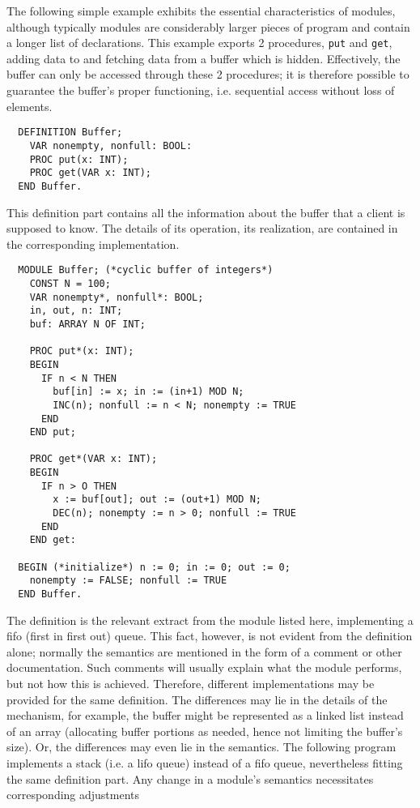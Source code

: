The following simple example exhibits the essential characteristics of modules, although
typically modules are considerably larger pieces of program and contain a longer list of
declarations. This example exports 2 procedures, \verb|put| and \verb|get|, adding data to
and fetching data from a buffer which is hidden. Effectively, the buffer can only be
accessed through these 2 procedures; it is therefore possible to guarantee the buffer's
proper functioning, i.e. sequential access without loss of elements.
\begin{verbatim}
  DEFINITION Buffer;
    VAR nonempty, nonfull: BOOL:
    PROC put(x: INT);
    PROC get(VAR x: INT);
  END Buffer.
\end{verbatim}
This definition part contains all the information about the buffer that a client is supposed
to know. The details of its operation, its realization, are contained in the corresponding
implementation.
\begin{verbatim}
  MODULE Buffer; (*cyclic buffer of integers*)
    CONST N = 100;
    VAR nonempty*, nonfull*: BOOL;
    in, out, n: INT;
    buf: ARRAY N OF INT;
 
    PROC put*(x: INT);
    BEGIN
      IF n < N THEN
        buf[in] := x; in := (in+1) MOD N;
        INC(n); nonfull := n < N; nonempty := TRUE
      END
    END put;
 
    PROC get*(VAR x: INT);
    BEGIN
      IF n > O THEN
        x := buf[out]; out := (out+1) MOD N;
        DEC(n); nonempty := n > 0; nonfull := TRUE
      END
    END get:
 
  BEGIN (*initialize*) n := 0; in := 0; out := 0;
    nonempty := FALSE; nonfull := TRUE
  END Buffer.
\end{verbatim}
The definition is the relevant extract from the module listed here, implementing a fifo
(first in first out) queue. This fact, however, is not evident from the definition alone;
normally the semantics are mentioned in the form of a comment or other documentation.
Such comments will usually explain what the module performs, but not how this is achieved.
Therefore, different implementations may be provided for the same definition. The differences
may lie in the details of the mechanism, for example, the buffer might be represented as a
linked list instead of an array (allocating buffer portions as needed, hence not limiting
the buffer's size). Or, the differences may even lie in the semantics. The following program
implements a stack (i.e. a lifo queue) instead of a fifo queue, nevertheless fitting the same
definition part. Any change in a module's semantics necessitates corresponding adjustments
